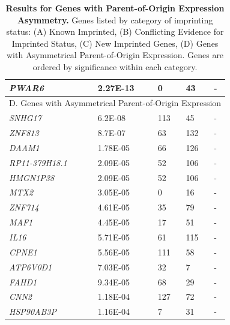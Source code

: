 \begin{table}
\begin{adjustbox}{width={\textwidth}}
\begin{tabular}{@{}p{3cm}|p{2cm}p{5cm}p{5cm}p{6cm}@{}}
 \emph{PWAR6} & 2.27E-13 & 0 & 43 & - \\ \midrule
 \multicolumn{5}{c}{D. Genes with Asymmetrical Parent-of-Origin Expression}  \\ \midrule
 \emph{SNHG17} & 6.2E-08 & 113 & 45 & - \\
 \emph{ZNF813} & 8.7E-07 & 63 & 132 & - \\
 \emph{DAAM1} & 1.78E-05 & 66 & 126 & -\\
 \emph{RP11-379H18.1} & 2.09E-05 & 52 & 106 & - \\
 \emph{HMGN1P38} & 2.09E-05 & 52 & 106 & - \\
 \emph{MTX2} & 3.05E-05 & 0 & 16 & - \\
\emph{ZNF714} & 4.61E-05 & 35 & 79 & - \\
\emph{MAF1} & 4.45E-05 & 17 & 51 & - \\
\emph{IL16} & 5.71E-05 & 61 & 115 & - \\
\emph{CPNE1} & 5.56E-05 & 111 & 58 & - \\
\emph{ATP6V0D1} & 7.03E-05 & 32 & 7  & - \\
\emph{FAHD1} & 9.34E-05 & 68 & 29 & - \\
\emph{CNN2} & 1.18E-04 & 127 & 72 & -\\
\emph{HSP90AB3P} & 1.16E-04 & 7 & 31 & - \\ \bottomrule
\end{tabular}
\end{adjustbox}
\caption[Results for Genes with Parent-of-Origin Expression Asymmetry. ]{\textbf{Results for Genes with Parent-of-Origin Expression Asymmetry. }
Genes listed by category of imprinting status: (A) Known Imprinted, (B) Conflicting Evidence for Imprinted Status, (C) New Imprinted Genes, (D) Genes with Asymmetrical Parent-of-Origin Expression. Genes are ordered by significance within each category.}
\label{tab:imprintedgenes}
\end{table}





